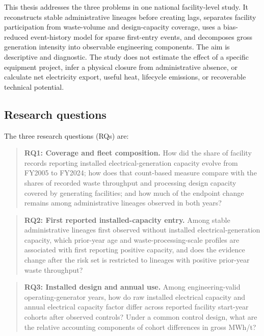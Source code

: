 \documentclass[12pt,letterpaper]{article}
\begin{document}
This thesis addresses the three problems in one national facility-level study.
It reconstructs stable administrative lineages before creating lags, separates
facility participation from waste-volume and design-capacity coverage, uses a
bias-reduced event-history model for sparse first-entry events, and decomposes
gross generation intensity into observable engineering components. The aim is
descriptive and diagnostic. The study does not estimate the effect of a
specific equipment project, infer a physical closure from administrative
absence, or calculate net electricity export, useful heat, lifecycle emissions,
or recoverable technical potential.

\subsection{Research questions}

The three research questions (RQs) are:

\begin{quote}
\textbf{RQ1: Coverage and fleet composition.} How did the share of facility
records reporting installed electrical-generation capacity evolve from FY2005
to FY2024; how does that count-based measure compare with the shares of recorded
waste throughput and processing design capacity covered by generating
facilities; and how much of the endpoint change remains among administrative
lineages observed in both years?
\end{quote}

\begin{quote}
\textbf{RQ2: First reported installed-capacity entry.} Among stable
administrative lineages first observed without installed electrical-generation
capacity, which prior-year age and waste-processing-scale profiles are
associated with first reporting positive capacity, and does the evidence change
after the risk set is restricted to lineages with positive prior-year waste
throughput?
\end{quote}

\begin{quote}
\textbf{RQ3: Installed design and annual use.} Among engineering-valid
operating-generator years, how do raw installed electrical capacity and annual
electrical capacity factor differ across reported facility start-year cohorts
after observed controls? Under a common control design, what are the relative
accounting components of cohort differences in gross MWh/t?
\end{quote}
\end{document}
